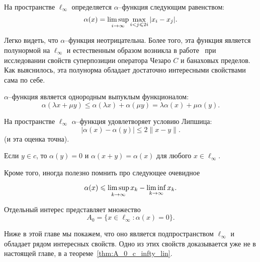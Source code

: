 На пространстве $\ell_\infty$ определяется $\alpha$--функция следующим равенством:
\begin{equation}
	\alpha(x) = \varlimsup_{i\to\infty} \max_{i<j\leqslant 2i} |x_i - x_j|
	.
\end{equation}

Легко видеть, что $\alpha$--функция неотрицательна.
Более того, эта функция является полунормой на $\ell_\infty$
и естественным образом возникла в работе~\cite[\S 2]{semenov2020invariant_noncommutative}
при исследовании свойств суперпозиции оператора Чезаро $C$ и банаховых пределов.
Как выяснилось, эта полунорма обладает достаточно интересными свойствами сама по себе.


\begin{property}
	\label{thm:alpha_x_triangle_ineq}
	$\alpha$--функция является однородным выпуклым функционалом:
	\begin{equation}
		\alpha(\lambda x+ \mu y)
		\leq
		 \alpha(\lambda x) + \alpha(\mu y) = \lambda \alpha(x) + \mu \alpha(y)
		.
	\end{equation}
\end{property}

\begin{property}
	На пространстве $\ell_\infty$ $\alpha$--функция удовлетворяет условию Липшица:
	\begin{equation}\label{alpha_Lipshitz}
		|\alpha(x) - \alpha(y)| \leq 2 \|x-y\|
		.
	\end{equation}
	(и эта оценка точна).
\end{property}

\begin{property}
	Если $y\in c$, то $\alpha(y) = 0$ и $\alpha(x+y) = \alpha(x)$ для любого $x \in \ell_\infty$.
\end{property}

Кроме того, иногда полезно помнить про следующее очевидное
\begin{property}
	\label{thm:alpha_x_leq_limsup_minus_liminf}
	\begin{equation}
		\alpha(x) \leq \varlimsup_{k\to\infty} x_k - \varliminf_{k\to\infty} x_k
		.
	\end{equation}
\end{property}

Отдельный интерес представляет множество
\begin{equation}
	A_0 = \{x\in\ell_\infty : \alpha(x) = 0\}
	.
\end{equation}

Ниже в этой главе мы покажем, что оно является подпространством $\ell_\infty$ и обладает рядом интересных свойств.
Одно из этих свойств доказывается уже не в настоящей главе, в а теореме~\ref{thm:A_0_c_infty_lin}.
